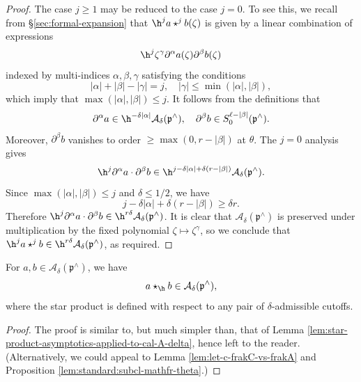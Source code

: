 \begin{proof}
  The case $j \geq 1$ may be reduced to the case $j=0$.  To see this, we recall from \S\ref{sec:formal-expansion} that $\h^j a \star^j b(\zeta)$ is given by a linear combination of expressions
  \begin{equation*}
    \h^j \zeta^\gamma \partial^\alpha a(\zeta) \partial^\beta b(\zeta)
  \end{equation*}
  indexed by multi-indices $\alpha, \beta, \gamma$ satisfying the conditions
  \begin{equation*}
    |\alpha| + |\beta| - |\gamma| = j,
    \quad
    |\gamma| \leq \min(|\alpha|,|\beta|),
  \end{equation*}
  which imply that $\max(|\alpha|,|\beta|) \leq j$.  It follows from the definitions that
  \begin{equation*}
    \partial^\alpha a \in \h^{- \delta |\alpha|} \mathcal{A}_{\delta}(\mathfrak{p}^\wedge), \quad
    \partial^{\beta} b \in S_0^{\ell-|\beta|}(\mathfrak{p}^\wedge).
  \end{equation*}
  Moreover, $\partial^{\beta} b$ vanishes to order $\geq \max(0,r - |\beta|)$ at $\theta$.  The $j = 0$ analysis gives
  \begin{equation*}
    \h^j \partial^\alpha a \cdot \partial^\beta b
    \in
    \h^{j - \delta |\alpha| + \delta ( r - |\beta|)} \mathcal{A}_{\delta}(\mathfrak{p}^\wedge).
  \end{equation*}
  Since $\max(|\alpha|,|\beta|) \leq j$ and $\delta \leq 1/2$, we have
  \begin{equation*}
    j - \delta |\alpha| + \delta ( r - |\beta|)
    \geq \delta r.
  \end{equation*}
  Therefore $\h^j \partial^\alpha a \cdot \partial^\beta b \in \h^{r \delta } \mathcal{A}_\delta(\mathfrak{p}^\wedge)$.  It is clear that $\mathcal{A}_{\delta}(\mathfrak{p}^\wedge)$ is preserved under multiplication by the fixed polynomial $\zeta \mapsto \zeta^\gamma$, so we conclude that $\h^j a \star^j b \in \h^{r \delta} \mathcal{A}_{\delta}(\mathfrak{p}^\wedge)$, as required.
\end{proof}

\begin{lemma}\label{lem:star-product-asymptotics-applied-to-cal-A-delta-2}
  For $a,b \in \mathcal{A}_\delta(\mathfrak{p}^\wedge)$, we have
  \begin{equation*}
    a \star_{\h} b \in \mathcal{A}_\delta(\mathfrak{p}^\wedge),
  \end{equation*}
  where the star product is defined with respect to any pair of $\delta$-admissible cutoffs.
\end{lemma}
\begin{proof}
  The proof is similar to, but much simpler than, that of Lemma \ref{lem:star-product-asymptotics-applied-to-cal-A-delta}, hence left to the reader.  (Alternatively, we could appeal to Lemma \ref{lem:let-c-frakC-vs-frakA} and Proposition \ref{lem:standard:subcl-mathfr-theta}.)
\end{proof}

